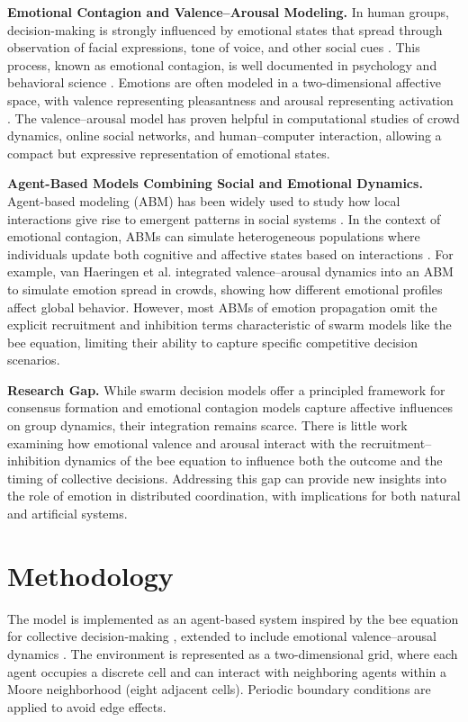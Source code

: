 \documentclass[a4paper,twoside]{article}
\begin{document}
\textbf{Emotional Contagion and Valence–Arousal Modeling.}  
In human groups, decision-making is strongly influenced by emotional states that spread through observation of facial expressions, tone of voice, and other social cues \cite{SHI2021769}. This process, known as emotional contagion, is well documented in psychology and behavioral science \cite{Hatfield1994}. Emotions are often modeled in a two-dimensional affective space, with valence representing pleasantness and arousal representing activation \cite{Russell1980}. The valence–arousal model has proven helpful in computational studies of crowd dynamics, online social networks, and human–computer interaction, allowing a compact but expressive representation of emotional states.

\textbf{Agent-Based Models Combining Social and Emotional Dynamics.}  
Agent-based modeling (ABM) has been widely used to study how local interactions give rise to emergent patterns in social systems \cite{TEMPLETON2024106520}. In the context of emotional contagion, ABMs can simulate heterogeneous populations where individuals update both cognitive and affective states based on interactions \cite{3577589}. For example, van Haeringen et al. \cite{vanHaeringen2021} integrated valence–arousal dynamics into an ABM to simulate emotion spread in crowds, showing how different emotional profiles affect global behavior. However, most ABMs of emotion propagation omit the explicit recruitment and inhibition terms characteristic of swarm models like the bee equation, limiting their ability to capture specific competitive decision scenarios.

\textbf{Research Gap.}  
While swarm decision models offer a principled framework for consensus formation and emotional contagion models capture affective influences on group dynamics, their integration remains scarce. There is little work examining how emotional valence and arousal interact with the recruitment–inhibition dynamics of the bee equation to influence both the outcome and the timing of collective decisions. Addressing this gap can provide new insights into the role of emotion in distributed coordination, with implications for both natural and artificial systems.



\section{Methodology}

The model is implemented as an agent-based system inspired by the bee equation for collective decision-making \cite{Seeley2011,Chase25}, extended to include emotional valence–arousal dynamics \cite{Russell1980,vanHaeringen2021}. The environment is represented as a two-dimensional grid, where each agent occupies a discrete cell and can interact with neighboring agents within a Moore neighborhood (eight adjacent cells). Periodic boundary conditions are applied to avoid edge effects.
\end{document}
